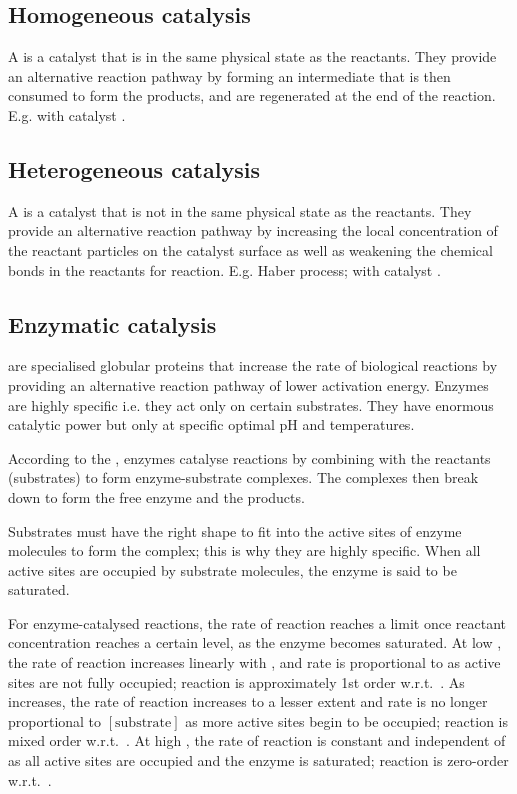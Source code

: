 \documentclass[Chemistry.tex]{subfiles}
\begin{document}
\subsection{Homogeneous catalysis}
A  is a catalyst that is in the same physical state as the reactants. They provide an alternative reaction pathway by forming an intermediate that is then consumed to form the products, and are regenerated at the end of the reaction. E.g.  with catalyst .
\subsection{Heterogeneous catalysis}
A  is a catalyst that is not in the same physical state as the reactants. They provide an alternative reaction pathway by increasing the local concentration of the reactant particles on the catalyst surface as well as weakening the chemical bonds in the reactants for reaction. E.g. Haber process;  with catalyst .
\subsection{Enzymatic catalysis}
 are specialised globular proteins that increase the rate of biological reactions by providing an alternative reaction pathway of lower activation energy. Enzymes are highly specific i.e. they act only on certain substrates. They have enormous catalytic power but only at specific optimal pH and temperatures.

According to the , enzymes catalyse reactions by combining with the reactants (substrates) to form enzyme-substrate complexes. The complexes then break down to form the free enzyme and the products.

Substrates must have the right shape to fit into the active sites of enzyme molecules to form the  complex; this is why they are highly specific. When all active sites are occupied by substrate molecules, the enzyme is said to be saturated.

For enzyme-catalysed reactions, the rate of reaction reaches a limit once reactant concentration reaches a certain level, as the enzyme becomes saturated. At low , the rate of reaction increases linearly with , and rate is proportional to  as active sites are not fully occupied; reaction is approximately 1st order w.r.t.\ . As  increases, the rate of reaction increases to a lesser extent and rate is no longer proportional to \(\left[\textrm{substrate}\right]\) as more active sites begin to be occupied; reaction is mixed order w.r.t.\ . At high , the rate of reaction is constant and independent of  as all active sites are occupied and the enzyme is saturated; reaction is zero-order w.r.t.\ .
\end{document}
